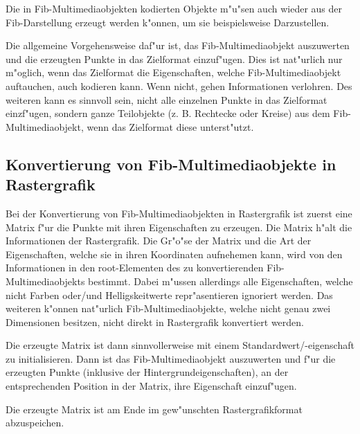 Die in Fib-Multimediaobjekten kodierten Objekte m"u"sen auch wieder aus der Fib-Darstellung erzeugt werden k"onnen, um sie beispielsweise Darzustellen.

Die allgemeine Vorgehensweise daf"ur ist, das Fib-Multimediaobjekt auszuwerten und die erzeugten Punkte in das Zielformat einzuf"ugen. Dies ist nat"urlich nur m"oglich, wenn das Zielformat die Eigenschaften, welche Fib-Multimediaobjekt auftauchen, auch kodieren kann. Wenn nicht, gehen Informationen verlohren.
Des weiteren kann es sinnvoll sein, nicht alle einzelnen Punkte in das Zielformat einzf"ugen, sondern ganze Teilobjekte (z. B. Rechtecke oder Kreise) aus dem Fib-Multimediaobjekt, wenn das Zielformat diese unterst"utzt.


\subsection{Konvertierung von Fib-Multimediaobjekte in Rastergrafik}

Bei der Konvertierung von Fib-Multimediaobjekten in Rastergrafik ist zuerst eine Matrix f"ur die Punkte mit ihren Eigenschaften zu erzeugen. Die Matrix h"alt die Informationen der Rastergrafik. Die Gr"o"se der Matrix und die Art der Eigenschaften, welche sie in ihren Koordinaten aufnehemen kann, wird von den Informationen in den root-Elementen des zu konvertierenden Fib-Multimediaobjekts bestimmt. Dabei m"ussen allerdings alle Eigenschaften, welche nicht Farben oder/und Helligskeitwerte repr"asentieren ignoriert werden. Das weiteren k"onnen nat"urlich Fib-Multimediaobjekte, welche nicht genau zwei Dimensionen besitzen, nicht direkt in Rastergrafik konvertiert werden.

Die erzeugte Matrix ist dann sinnvollerweise mit einem Standardwert/-eigenschaft zu initialisieren. Dann ist das Fib-Multimediaobjekt auszuwerten und f"ur die erzeugten Punkte (inklusive der Hintergrundeigenschaften), an der entsprechenden Position in der Matrix, ihre Eigenschaft einzuf"ugen.

Die erzeugte Matrix ist am Ende im gew"unschten Rastergrafikformat abzuspeichen.










